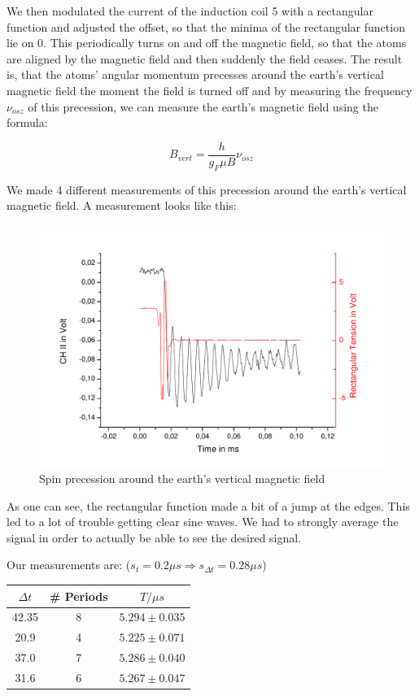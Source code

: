 We then modulated the current of the induction coil 5 with a rectangular function and adjusted the offset, so that the minima of the rectangular function lie on 0. This periodically turns on and off the magnetic field, so that the atoms are aligned by the magnetic field and then suddenly the field ceases. The result is, that the atoms' angular momentum precesses around the earth's vertical magnetic field the moment the field is turned off and by measuring the frequency $\nu_{osz}$ of this precession, we can measure the earth's magnetic field using the formula:

$$ B_{vert} = \frac{h}{g_F\mu B}\nu_{osz} $$

We made 4 different measurements of this precession around the earth's vertical magnetic field. A measurement looks like this:

\begin{figure}[H]
\centering \includegraphics[width=\textwidth]{BilderAusw/Spinpr.pdf}
\caption{Spin precession around the earth's vertical magnetic field}
\end{figure}

As one can see, the rectangular function made a bit of a jump at the edges. This led to a lot of trouble getting clear sine waves. We had to strongly average the signal in order to actually be able to see the desired signal.

Our measurements are: ($s_t = 0.2 \mu s \Rightarrow s_{\Delta t} = 0.28 \mu s$)

\begin{center}
\begin{tabular}[H]{c c c}
$\Delta t$ & \# Periods & $T/\mu s$\\ \hline
42.35 & 8 & $5.294 \pm 0.035$\\
20.9   & 4 & $5.225 \pm 0.071$\\
37.0   & 7 & $5.286 \pm  0.040$\\
31.6   & 6 & $5.267 \pm  0.047$\\
\end{tabular}
\end{center}

